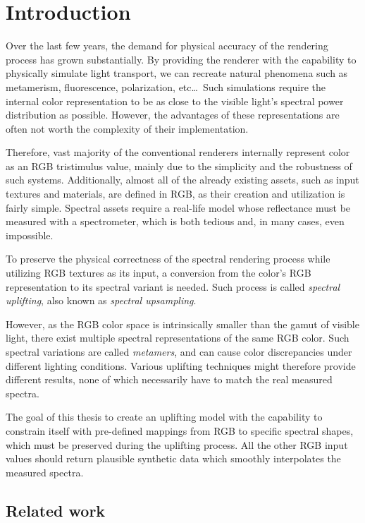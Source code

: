 \chapter*{Introduction}

Over the last few years, the demand for physical accuracy of the rendering process has grown substantially. By providing the renderer with the capability to physically simulate light transport, we can recreate natural phenomena such as metamerism, fluorescence, polarization, etc\ldots~Such simulations require the internal color representation to be as close to the visible light's spectral power distribution as possible. However, the advantages of these representations are often not worth the complexity of their implementation.

Therefore, vast majority of the conventional renderers internally represent color as an RGB tristimulus value, mainly due to the simplicity and the robustness of such systems. Additionally, almost all of the already existing assets, such as input textures and materials, are defined in RGB, as their creation and utilization is fairly simple. Spectral assets require a real-life model whose reflectance must be measured with a spectrometer, which is both tedious and, in many cases, even impossible.

To preserve the physical correctness of the spectral rendering process while utilizing RGB textures as its input, a conversion from the color's RGB representation to its spectral variant is needed. Such process is called \emph{spectral uplifting}, also known as \emph{spectral upsampling}.

However, as the RGB color space is intrinsically smaller than the gamut of visible light, there exist multiple spectral representations of the same RGB color. Such spectral variations are called \emph{metamers}, and can cause color discrepancies under different lighting conditions. Various uplifting techniques might therefore provide different results, none of which necessarily have to match the real measured spectra.

The goal of this thesis to create an uplifting model with the capability to constrain itself with pre-defined mappings from RGB to specific spectral shapes, which must be preserved during the uplifting process. All the other RGB input values should return plausible synthetic data which smoothly interpolates the measured spectra.
 
\section*{Related work}

